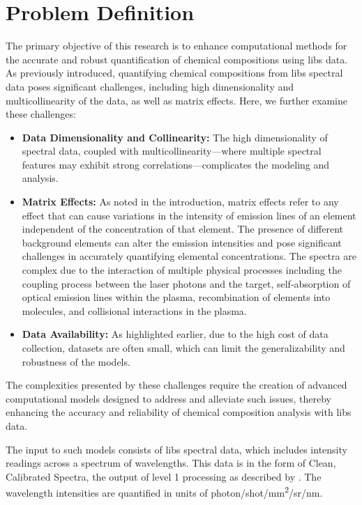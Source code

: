 \section{Problem Definition}\label{sec:problem_definition}
The primary objective of this research is to enhance computational methods for the accurate and robust quantification of chemical compositions using \gls{libs} data.
As previously introduced, quantifying chemical compositions from \gls{libs} spectral data poses significant challenges, including high dimensionality and multicollinearity of the data, as well as matrix effects.
Here, we further examine these challenges:
\begin{itemize}
    \item \textbf{Data Dimensionality and Collinearity:} The high dimensionality of spectral data, coupled with multicollinearity—where multiple spectral features may exhibit strong correlations—complicates the modeling and analysis\cite{andersonImprovedAccuracyQuantitative2017}.
    \item \textbf{Matrix Effects:} As noted in the introduction, matrix effects refer to any effect that can cause variations in the intensity of emission lines of an element independent of the concentration of that element. The presence of different background elements can alter the emission intensities and pose significant challenges in accurately quantifying elemental concentrations. The spectra are complex due to the interaction of multiple physical processes including the coupling process between the laser photons and the target, self-absorption of optical emission lines within the plasma, recombination of elements into molecules, and collisional interactions in the plasma\cite{cleggRecalibrationMarsScience2017, andersonImprovedAccuracyQuantitative2017}.
    \item \textbf{Data Availability:} As highlighted earlier, due to the high cost of data collection, datasets are often small, which can limit the generalizability and robustness of the models\cite{p9_paper}.
\end{itemize}

The complexities presented by these challenges require the creation of advanced computational models designed to address and alleviate such issues, thereby enhancing the accuracy and reliability of chemical composition analysis with \gls{libs} data.

The input to such models consists of \gls{libs} spectral data, which includes intensity readings across a spectrum of wavelengths.
This data is in the form of Clean, Calibrated Spectra\cite{andersonImprovedAccuracyQuantitative2017}, the output of level 1 processing as described by \citet{wiensPreflightCalibrationInitial2013}.
The wavelength intensities are quantified in units of photon/shot/mm\textsuperscript{2}/sr/nm.

